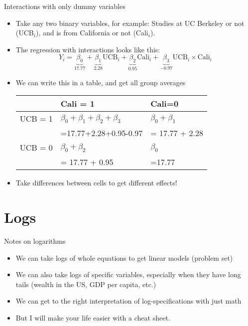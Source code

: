 \documentclass[11pt]{beamer}
\begin{document}
\begin{frame}{Interactions with only dummy variables}
\begin{itemize}
    \item Take any two binary variables, for example: Studies at UC Berkeley or not (UCB$_i$), and is from California or not (Cali$_i$). 
    \item The regression with interactions looks like this:
$$
Y_i = \underbrace{\beta_0}_{17.77} + \underbrace{\beta_1}_{2.28}\text{UCB}_i + \underbrace{\beta_2}_{0.95}\text{Cali}_i + \underbrace{\beta_3}_{-0.97}\text{UCB}_i \times \text{Cali}_i
$$
\item We can write this in a table, and get all group averages
\vspace{0.25cm}
    \begin{table}[]
\begin{tabular}{lll}
\toprule
                      & Cali = 1                                                & Cali=0            \\ \midrule
UCB = 1           & $\beta_0 + \beta_1 + \beta_2 + \beta_3$ & $\beta_0 + \beta_1$  \\
& =17.77+2.28+0.95-0.97 &  = 17.77 + 2.28 \\
UCB = 0  & $\beta_0 + \beta_2$                            & $\beta_0$                  \\
& = 17.77 + 0.95 & =17.77 \\
\bottomrule
\end{tabular}
\end{table}
\vspace{0.25cm}

\item Take differences between cells to get different effects!
\end{itemize}

\end{frame}







\section{Logs} 
 \begin{frame}{Notes on logarithms}
     \begin{itemize}
         \item We can take logs of whole equations to get linear models (problem set)
         \item We can also take logs of specific variables, especially when they have long tails (wealth in the US, GDP per capita, etc.)
        \item We can get to the right interpretation of log-specifications with just math \pause
        \item But I will make your life easier with a cheat sheet.
     \end{itemize}
 \end{frame}
\end{document}
